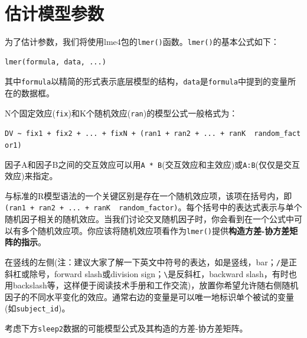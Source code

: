 \documentclass[
]{book}
\begin{document}
\hypertarget{ux4f30ux8ba1ux6a21ux578bux53c2ux6570}{%
\section{估计模型参数}\label{ux4f30ux8ba1ux6a21ux578bux53c2ux6570}}

为了估计参数，我们将使用lme4包的\texttt{lmer()}函数\citep{Bates_et_al_2015}。\texttt{lmer()}的基本公式如下：

\begin{verbatim}
lmer(formula, data, ...)
\end{verbatim}

其中\texttt{formula}以精简的形式表示底层模型的结构，\texttt{data}是\texttt{formula}中提到的变量所在的数据框。

N个固定效应(\texttt{fix})和K个随机效应(\texttt{ran})的模型公式一般格式为：

\texttt{DV\ \textasciitilde{}\ fix1\ +\ fix2\ +\ ...\ +\ fixN\ +\ (ran1\ +\ ran2\ +\ ...\ +\ ranK\ \textbar{}\ random\_factor1)}

因子A和因子B之间的交互效应可以用\texttt{A\ *\ B}(交互效应和主效应)或\texttt{A:B}(仅仅是交互效应)来指定。

与标准的R模型语法的一个关键区别是存在一个随机效应项，该项在括号内，即\texttt{(ran1\ +\ ran2\ +\ ...\ +\ ranK\ \textbar{}\ random\_factor)}。每个括号中的表达式表示与单个随机因子相关的随机效应。当我们讨论交叉随机因子时，你会看到在一个公式中可以有多个随机效应项。你应该将随机效应项看作为\texttt{lmer()}提供\textbf{构造方差-协方差矩阵的指示}。

在竖线\texttt{\textbar{}}的左侧(注：建议大家了解一下英文中符号的表达，如\texttt{\textbar{}}是竖线，bar；\texttt{/}是正斜杠或除号，forward slash或division sign；\texttt{\textbackslash{}}是反斜杠，backward slash，有时也用backslash等，这样便于阅读技术手册和工作交流)，放置你希望允许随右侧随机因子的不同水平变化的效应。通常右边的变量是可以唯一地标识单个被试的变量(如\texttt{subject\_id})。

考虑下方\texttt{sleep2}数据的可能模型公式及其构造的方差-协方差矩阵。
\end{document}
